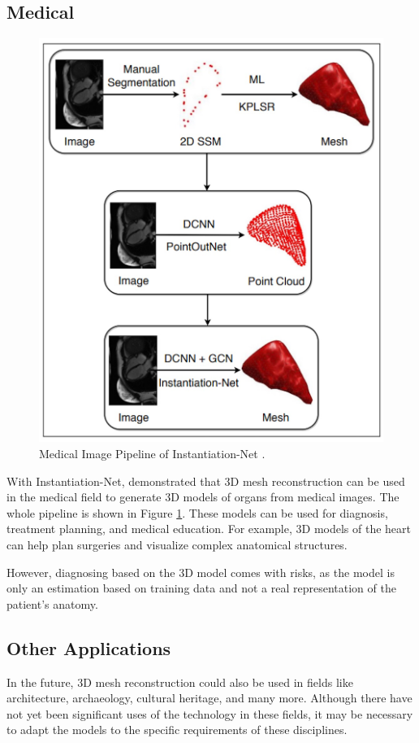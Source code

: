 \subsection{Medical}
\begin{figure}
    \centering
    \includegraphics[width=0.7\linewidth]{images/medical.jpg}
    \caption{Medical Image Pipeline of Instantiation-Net \autocite{wang_instantiation-net_2019}.}
    \label{fig:medical}
\end{figure}

With Instantiation-Net, \textcite{wang_instantiation-net_2019} demonstrated that 3D mesh reconstruction can be used in the medical field to generate 3D models of organs from medical images. The whole pipeline is shown in Figure \ref{fig:medical}. These models can be used for diagnosis, treatment planning, and medical education. For example, 3D models of the heart can help plan surgeries and visualize complex anatomical structures.

However, diagnosing based on the 3D model comes with risks, as the model is only an estimation based on training data and not a real representation of the patient's anatomy.

\subsection{Other Applications}
In the future, 3D mesh reconstruction could also be used in fields like architecture, archaeology, cultural heritage, and many more.
Although there have not yet been significant uses of the technology in these fields, it may be necessary to adapt the models to the specific requirements of these disciplines.

